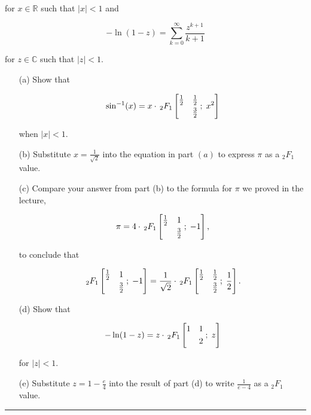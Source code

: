 \documentclass[12pt]{amsart}
\theoremstyle{definition}
\theoremstyle{remark}
\numberwithin{equation}{section}
\def\C{\mathbb C}
\def \R {\mathcal R}
\def\C{\mathbb{C}}
\def\R{\mathbb{R}}
\newcommand*\HYPERskip{&}
\newcommand*\pFq{
\begingroup
\catcode`\,\active
\def ,{\HYPERskip}%
\doHyper
}
\def\doHyper#1#2#3#4#5{%
\, _{#1}F_{#2}\left[\begin{matrix}#3 \smallskip \\  #4\end{matrix} \; ; \; #5\right]%
\endgroup
}
\begin{document}
\begin{itemize}
    for $x \in \R$ such that $|x| < 1$ and 

    $$-\ln(1 - z) = \sum_{k=0}^{\infty} \frac{z^{k+1}}{k+1}$$

    for $z \in \C$ such that $|z| < 1$.

    \vspace{4mm}

    \begin{itemize}
     \item[(a)] Show that 

     $$\sin^{-1}(x) = x \cdot \pFq{2}{1}{\frac{1}{2}&\frac{1}{2}}{&\frac{3}{2}}{x^2}$$

     when $|x| < 1$.

     \vspace{4mm}

     \item[(b)] Substitute $x = \frac{1}{\sqrt{2}}$ into the equation in part $(a)$ to express $\pi$ as a $_{2}F_{1}$ value.

     \vspace{4mm}

     \item[(c)] Compare your answer from part (b) to the formula for $\pi$ we proved in the lecture,

     $$\pi = 4 \cdot \pFq{2}{1}{\frac{1}{2}&1}{&\frac{3}{2}}{-1},$$

     to conclude that 

     $$\pFq{2}{1}{\frac{1}{2}&1}{&\frac{3}{2}}{-1} = \frac{1}{\sqrt{2}} \cdot \pFq{2}{1}{\frac{1}{2}&\frac{1}{2}}{&\frac{3}{2}}{\frac{1}{2}}.$$

     \vspace{4mm}

     \item[(d)] Show that 

     $$-\ln(1-z) = z \cdot \pFq{2}{1}{1&1}{&2}{z}$$

     for $|z| < 1$.

     \vspace{6mm}

     \item[(e)] Substitute $z = 1 - \frac{e}{4}$ into the result of part (d) to write $\frac{1}{e-4}$ as a $_{2}F_{1}$ value.
    \end{itemize}

    \vspace{2mm}

    \hrule{}

    \vspace{8mm}


\end{itemize}
\end{document}
